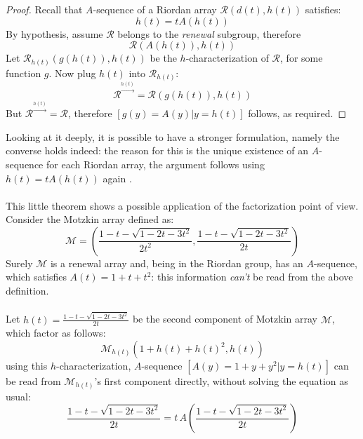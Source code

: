 \begin{proof}
    Recall that $A$-sequence of a Riordan array $\mathcal{R}\left(d(t), h(t)\right)$
    satisfies:
    \begin{displaymath}
        h(t)=tA(h(t))
    \end{displaymath}
    By hypothesis, assume $\mathcal{R}$ belongs to the \emph{renewal} subgroup, therefore
    \begin{displaymath}
        \mathcal{R}\left(A(h(t)), h(t)\right)
    \end{displaymath}
    Let $\mathcal{R}_{h(t)}\left(g(h(t)), h(t)\right)$ be the $h$-characterization of $\mathcal{R}$,
    for some function $g$. Now plug $h(t)$ into $\mathcal{R}_{h(t)}$:
    \begin{displaymath}
        \mathcal{R}^{\stackrel{h(t)}{\rightarrow}} =
            \mathcal{R}\left(g(h(t)), h(t)\right)
    \end{displaymath}
    But $\mathcal{R}^{\stackrel{h(t)}{\rightarrow}} = \mathcal{R}$, therefore 
    $[g(y)=A(y)|y=h(t)]$ follows, as required.

\end{proof}

Looking at it deeply, it is possible to have a stronger formulation, namely the 
converse holds indeed: the reason for this is the unique existence of an $A$-sequence
for each Riordan array, the argument follows using $h(t)=tA(h(t))$ again .
\\\\
This little theorem shows a possible application of the factorization point of view.
Consider the Motzkin array defined as:
\begin{displaymath} 
    \mathcal{M} =\left( \frac{1-t-\sqrt{1-2t-3t^2}}{2t^2},
       \frac{1-t-\sqrt{1-2t-3t^2}}{2t}  \right)
\end{displaymath} 
Surely $\mathcal{M}$ is a renewal array and, being in the Riordan group, 
has an $A$-sequence, which satisfies $A(t)=1+t+t^2$: 
this information \emph{can't} be read from the above definition.
\\\\
Let $h(t)=\frac{1-t-\sqrt{1-2t-3t^2}}{2t}$ be the second
component of Motzkin array $\mathcal{M}$, which factor as follows:
\begin{displaymath} 
    \mathcal{M}_{h(t)}\left( 1+h(t)+h(t)^2, h(t) \right) 
\end{displaymath} 
using this $h$-characterization, $A$-sequence $[A(y)=1+y+y^2|y=h(t)]$ can
be read from $\mathcal{M}_{h(t)}$'s first component directly, without
solving the equation as usual:
\begin{displaymath} 
    \frac{1-t-\sqrt{1-2t-3t^2}}{2t} = t\,A\left(\frac{1-t-\sqrt{1-2t-3t^2}}{2t}\right)
\end{displaymath} 

